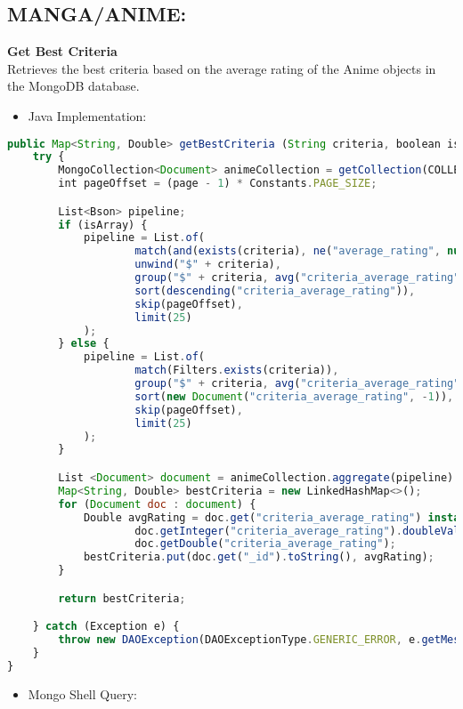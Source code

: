 \subsection*{MANGA/ANIME:}
\textbf{Get Best Criteria}\\
Retrieves the best criteria based on the average rating of the Anime objects in the MongoDB database.
\begin{itemize}
    \item Java Implementation:
\end{itemize}
\begin{lstlisting}[language=JavaScript]
public Map<String, Double> getBestCriteria (String criteria, boolean isArray, int page) throws DAOException {
    try {
        MongoCollection<Document> animeCollection = getCollection(COLLECTION_NAME);
        int pageOffset = (page - 1) * Constants.PAGE_SIZE;

        List<Bson> pipeline;
        if (isArray) {
            pipeline = List.of(
                    match(and(exists(criteria), ne("average_rating", null))),
                    unwind("$" + criteria),
                    group("$" + criteria, avg("criteria_average_rating", "$average_rating")),
                    sort(descending("criteria_average_rating")),
                    skip(pageOffset),
                    limit(25)
            );
        } else {
            pipeline = List.of(
                    match(Filters.exists(criteria)),
                    group("$" + criteria, avg("criteria_average_rating", "$average_rating")),
                    sort(new Document("criteria_average_rating", -1)),
                    skip(pageOffset),
                    limit(25)
            );
        }

        List <Document> document = animeCollection.aggregate(pipeline).into(new ArrayList<>());
        Map<String, Double> bestCriteria = new LinkedHashMap<>();
        for (Document doc : document) {
            Double avgRating = doc.get("criteria_average_rating") instanceof Integer?
                    doc.getInteger("criteria_average_rating").doubleValue() :
                    doc.getDouble("criteria_average_rating");
            bestCriteria.put(doc.get("_id").toString(), avgRating);
        }

        return bestCriteria;

    } catch (Exception e) {
        throw new DAOException(DAOExceptionType.GENERIC_ERROR, e.getMessage());
    }
}
\end{lstlisting}
\begin{itemize}
    \item Mongo Shell Query:
\end{itemize}
